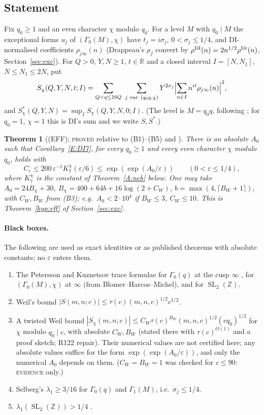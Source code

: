 \documentclass[10pt,reqno]{amsart}
\newtheorem{theorem}{Theorem}[section]
\theoremstyle{definition}
\numberwithin{equation}{section}
\newcommand{\Z}{\mathbb Z}
\newcommand{\R}{\mathbb R}
\DeclareMathOperator{\SL}{SL}
\newcommand{\status}[1]{\textup{\textsc{#1}}}
\begin{document}
\subsection{Statement}
Fix $q_0\ge1$ and an even character $\chi$ modulo $q_0$. For a level
$M$ with $q_0\mid M$ the exceptional forms $u_j$ of $(\Gamma_0(M),\chi)$
have $t_j=i\sigma_j$, $0<\sigma_j\le1/4$, and DI-normalised coefficients
$\rho_{j\infty}(n)$ (Drappeau's $\rho_f$ convert by
$\rho^{\rm DI}(n)=2n^{1/2}\rho^{\rm Dr}(n)$, Section~\ref{sec:exc}). For
$Q>0$, $Y,N\ge1$, $t\in\R$ and a closed interval $I=[N,N_1]$,
$N\le N_1\le2N$, put
\[
 S_\chi(Q,Y,N,t;I)=\sum_{Q<q\le16Q}\ \sum_{j\ \mathrm{exc}\ (q_0q,\chi)}
 Y^{2\sigma_j}\Bigl|\sum_{n\in I}n^{it}\rho_{j\infty}(n)\Bigr|^2,
\]
and $S_\chi^*(Q,Y,N)=\sup_IS_\chi(Q,Y,N,0;I)$.
(The level is $M=q_0q$, following \cite[p.~17]{Dr}; for $q_0=1$, $\chi=1$
this is DI's sum \cite[(8.4)]{DI} and we write $S,S^*$.)

\begin{theorem}[\textup{(EFF)}; \status{proved} relative to (B1)--(B5) and \cite{TTL3}]\label{A:eff}
There is an absolute $A_0$ such that Corollary~\ref{E:DI7}, for every
$q_0\ge1$ and every even character $\chi$ modulo $q_0$, holds with
\[
 C_\varepsilon\le 200\,\varepsilon^{-1}K_7^\chi(\varepsilon/6)\le\exp(\exp(A_0/\varepsilon))
 \qquad(0<\varepsilon\le1/4),
\]
where $K_7^\chi$ is the constant of Theorem~\ref{A:neb} below. One may take
$A_0=24B_\chi+30$, $B_\chi=400+64b+16\log(2+C_W)$, $b=\max(4,\lceil B_W+1\rceil)$,
with $C_W,B_W$ from (B3); e.g.\ $A_0<2\cdot10^4$ if $B_W\le3$, $C_W\le10$.
This is Theorem~\ref{hyp:eff} of Section~\ref{sec:exc}.
\end{theorem}

\paragraph{Black boxes.} The following are used as exact identities or as
published theorems with absolute constants; no $\varepsilon$ enters them.
\begin{enumerate}
\item[(B1)] The Petersson and Kuznetsov trace formulae for $\Gamma_0(q)$ at
the cusp $\infty$ \cite[\S4, (1.19)]{DI}, for $(\Gamma_0(M),\chi)$ at
$\infty$ \cite[Lemma~4.5, (4.13)--(4.17)]{Dr} (from Blomer--Harcos--Michel),
and for $\SL_2(\Z)$.
\item[(B2)] Weil's bound $|S(m,n;c)|\le\tau(c)(m,n,c)^{1/2}c^{1/2}$.
\item[(B3)] A twisted Weil bound $|S_\chi(m,n;c)|\le C_W\tau(c)^{B_W}(m,n,c)^{1/2}(cq_0)^{1/2}$
for $\chi$ modulo $q_0\mid c$, with absolute $C_W,B_W$ \cite[Lemma~4.2]{Dr}
(stated there with $\tau(c)^{O(1)}$ and a proof sketch; R122 repair).
Their numerical values are not certified here; any absolute values suffice
for the form $\exp(\exp(A_0/\varepsilon))$, and only the numerical $A_0$
depends on them. ($C_W=B_W=1$ was checked for $c\le90$: \status{evidence} only.)
\item[(B4)] Selberg's $\lambda_1\ge3/16$ for $\Gamma_0(q)$ and $\Gamma_1(M)$, i.e.\ $\sigma_j\le1/4$.
\item[(B5)] $\lambda_1(\SL_2(\Z))>1/4$ \cite[Theorem~3]{DI}.
\end{enumerate}
\end{document}
